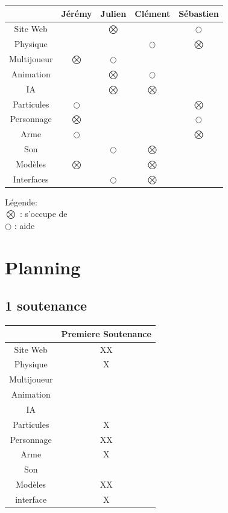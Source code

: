 ﻿\documentclass{article}
\begin{document}
\begin{tabular}{|c|c|c|c|c|}
\hline
			&	Jérémy		&	Julien		&	Clément		&	Sébastien	\\ \hline
Site Web	&				& $\bigotimes$	& 				& $\bigcirc$	\\ \hline
Physique	&				&				& $\bigcirc$	& $\bigotimes$	\\ \hline
Multijoueur	& $\bigotimes$	& $\bigcirc$	&				& 				\\ \hline
Animation	&				& $\bigotimes$	& $\bigcirc$	&				\\ \hline
IA			& 				& $\bigotimes$	& $\bigotimes$	&				\\ \hline
Particules	& $\bigcirc$	& 				&				& $\bigotimes$	\\ \hline
Personnage	& $\bigotimes$	&				& 				& $\bigcirc$	\\ \hline
Arme		& $\bigcirc$	&				&				& $\bigotimes$	\\ \hline
Son			&				& $\bigcirc$	& $\bigotimes$	&				\\ \hline
Modèles		& $\bigotimes$	&				& $\bigotimes$	&				\\ \hline
Interfaces	& 				& $\bigcirc$	& $\bigotimes$	&				\\ \hline
\end{tabular}

Légende:\\
$\bigotimes$ : s'occupe de\\
$\bigcirc$ : aide

\section{Planning}
\subsection{1\iere{} soutenance}
\begin{tabular}{|c|c|}
\hline
			&	Premiere Soutenance	\\ \hline
Site Web	&	XX		\\ \hline
Physique	&	X		\\ \hline
Multijoueur	&			\\ \hline
Animation	&			\\ \hline
IA	        &			\\ \hline
Particules	&	X		\\ \hline
Personnage	&	XX		\\ \hline
Arme		&	X		\\ \hline
Son			&			\\ \hline
Modèles		&	XX		\\ \hline
interface	&	X	    \\ \hline
\end{tabular}
\end{document}
